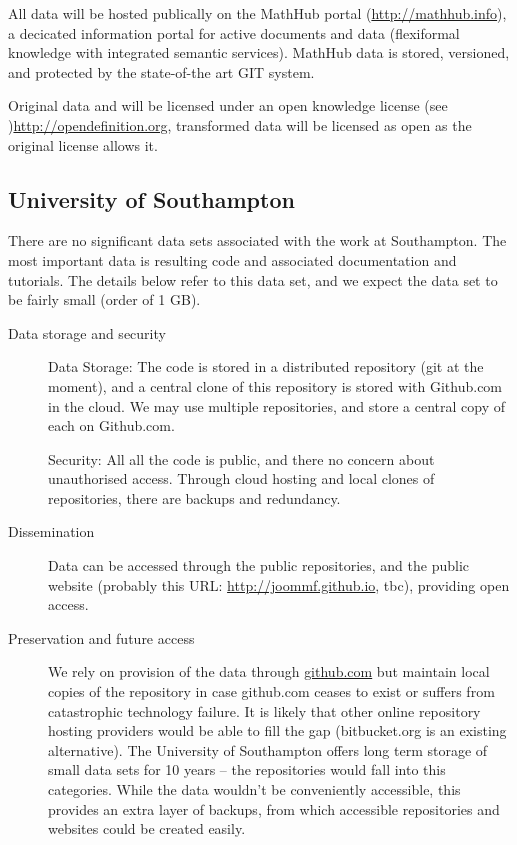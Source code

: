 \documentclass[12pt]{article}
\begin{document}
All data will be hosted publically on the MathHub portal (\url{http://mathhub.info}), a
decicated information portal for active documents and data (flexiformal knowledge with
integrated semantic services). MathHub data is stored, versioned, and protected by the
state-of-the art GIT system.

Original data and will be licensed under an open knowledge license (see
)\url{http://opendefinition.org}, transformed data will be licensed as open as the
original license allows it.

\subsection{University of Southampton}

There are no significant data sets associated with the work at Southampton. The most important data is resulting code and associated documentation and tutorials. The details below refer to this data set, and we expect the data set to be fairly small (order of 1 GB).
\begin{description}
\item[Data storage and security] Data Storage: The code is stored in a distributed repository (git at the moment), and a central clone of this repository is stored with Github.com in the cloud. We may use multiple repositories, and store a central copy of each on Github.com.

  Security: All all the code is public, and there no concern about unauthorised access. Through cloud hosting and local clones of repositories, there are backups and redundancy.
\item[Dissemination] Data can be accessed through the public repositories, and the public website (probably this URL: \href{http://joommf.github.io}{http://joommf.github.io}, tbc), providing open access.
\item[Preservation and future access] We rely on provision of the data through \href{github.com}{github.com} but maintain local copies of the repository in case github.com ceases to exist or suffers from catastrophic technology failure. It is likely that other online repository hosting providers would be able to fill the gap (bitbucket.org is an existing alternative). The University of Southampton offers long term storage of small data sets for 10 years -- the repositories would fall into this categories. While the data wouldn't be conveniently accessible, this provides an extra layer of backups, from which accessible repositories and websites could be created easily.
\end{description}
\end{document}
